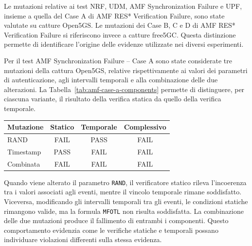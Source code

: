 Le mutazioni relative ai test NRF, UDM, AMF Synchronization Failure e UPF, insieme a quella del Case A di AMF RES* Verification Failure, sono state valutate su catture Open5GS. Le mutazioni dei Case B, C e D di AMF RES* Verification Failure si riferiscono invece a catture free5GC. Questa distinzione permette di identificare l'origine delle evidenze utilizzate nei diversi esperimenti.


Per il test AMF Synchronization Failure -- Case A sono state considerate tre mutazioni della cattura Open5GS, relative rispettivamente ai valori dei parametri di autenticazione, agli intervalli temporali e alla combinazione delle due alterazioni. La Tabella~\ref{tab:amf-case-a-components} permette di distinguere, per ciascuna variante, il risultato della verifica statica da quello della verifica temporale.

\begin{center}
\begin{minipage}{0.92\textwidth}
\centering
\begingroup
\small
\setlength{\tabcolsep}{5pt}
\renewcommand{\arraystretch}{1.2}

\begin{tabularx}{\linewidth}{|
    >{\raggedright\arraybackslash}X|
    c|c|c|}
\hline
\rowcolor{blue!7}
\textbf{Mutazione} &
\textbf{Statico} &
\textbf{Temporale} &
\textbf{Complessivo} \\
\hline
RAND & FAIL & PASS & FAIL \\
\hline
Timestamp & PASS & FAIL & FAIL \\
\hline
Combinata & FAIL & FAIL & FAIL \\
\hline
\end{tabularx}

\endgroup
{}
\label{tab:amf-case-a-components}
\end{minipage}
\end{center}


Quando viene alterato il parametro \texttt{RAND}, il verificatore statico rileva l'incoerenza tra i valori associati agli eventi, mentre il vincolo temporale rimane soddisfatto. Viceversa, modificando gli intervalli temporali tra gli eventi, le condizioni statiche rimangono valide, ma la formula \texttt{MFOTL} non risulta soddisfatta. La combinazione delle due mutazioni produce il fallimento di entrambi i componenti. Questo comportamento evidenzia come le verifiche statiche e temporali possano individuare violazioni differenti sulla stessa evidenza.

